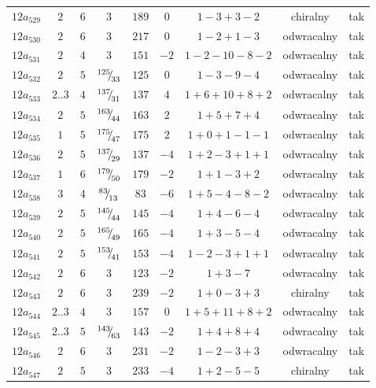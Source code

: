 \begin{longtable}{ccccccccc}
$12a_{529}$ & $2$ & $6$ & $3$ & $189$ & $0$ & $1-3+3-2$ & chiralny & tak \\
$12a_{530}$ & $2$ & $6$ & $3$ & $217$ & $0$ & $1-2+1-3$ & odwracalny & tak \\
$12a_{531}$ & $2$ & $4$ & $3$ & $151$ & $-2$ & $1-2-10-8-2$ & odwracalny & tak \\
$12a_{532}$ & $2$ & $5$ & ${}^{125}{\mskip -5mu/\mskip -3mu}_{33}$ & $125$ & $0$ & $1-3-9-4$ & odwracalny & tak \\
$12a_{533}$ & $2..3$ & $4$ & ${}^{137}{\mskip -5mu/\mskip -3mu}_{31}$ & $137$ & $4$ & $1+6+10+8+2$ & odwracalny & tak \\
$12a_{534}$ & $2$ & $5$ & ${}^{163}{\mskip -5mu/\mskip -3mu}_{44}$ & $163$ & $2$ & $1+5+7+4$ & odwracalny & tak \\
$12a_{535}$ & $1$ & $5$ & ${}^{175}{\mskip -5mu/\mskip -3mu}_{47}$ & $175$ & $2$ & $1+0+1-1-1$ & odwracalny & tak \\
$12a_{536}$ & $2$ & $5$ & ${}^{137}{\mskip -5mu/\mskip -3mu}_{29}$ & $137$ & $-4$ & $1+2-3+1+1$ & odwracalny & tak \\
$12a_{537}$ & $1$ & $6$ & ${}^{179}{\mskip -5mu/\mskip -3mu}_{50}$ & $179$ & $-2$ & $1+1-3+2$ & odwracalny & tak \\
$12a_{538}$ & $3$ & $4$ & ${}^{83}{\mskip -5mu/\mskip -3mu}_{13}$ & $83$ & $-6$ & $1+5-4-8-2$ & odwracalny & tak \\
$12a_{539}$ & $2$ & $5$ & ${}^{145}{\mskip -5mu/\mskip -3mu}_{44}$ & $145$ & $-4$ & $1+4-6-4$ & odwracalny & tak \\
$12a_{540}$ & $2$ & $5$ & ${}^{165}{\mskip -5mu/\mskip -3mu}_{49}$ & $165$ & $-4$ & $1+3-5-4$ & odwracalny & tak \\
$12a_{541}$ & $2$ & $5$ & ${}^{153}{\mskip -5mu/\mskip -3mu}_{41}$ & $153$ & $-4$ & $1-2-3+1+1$ & odwracalny & tak \\
$12a_{542}$ & $2$ & $6$ & $3$ & $123$ & $-2$ & $1+3-7$ & odwracalny & tak \\
$12a_{543}$ & $2$ & $6$ & $3$ & $239$ & $-2$ & $1+0-3+3$ & chiralny & tak \\
$12a_{544}$ & $2..3$ & $4$ & $3$ & $157$ & $0$ & $1+5+11+8+2$ & odwracalny & tak \\
$12a_{545}$ & $2..3$ & $5$ & ${}^{143}{\mskip -5mu/\mskip -3mu}_{63}$ & $143$ & $-2$ & $1+4+8+4$ & odwracalny & tak \\
$12a_{546}$ & $2$ & $6$ & $3$ & $231$ & $-2$ & $1-2-3+3$ & odwracalny & tak \\
$12a_{547}$ & $2$ & $5$ & $3$ & $233$ & $-4$ & $1+2-5-5$ & chiralny & tak \\

\end{longtable}
